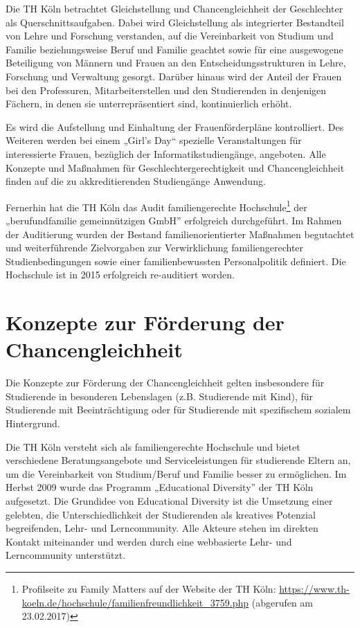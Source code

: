 Die TH Köln betrachtet Gleichstellung und Chancengleichheit der
Geschlechter als Querschnittsaufgaben. Dabei wird Gleichstellung als
integrierter Bestandteil von Lehre und Forschung verstanden, auf die
Vereinbarkeit von Studium und Familie beziehungsweise Beruf und Familie
geachtet sowie für eine ausgewogene Beteiligung von Männern und Frauen
an den Entscheidungsstrukturen in Lehre, Forschung und Verwaltung
gesorgt. Darüber hinaus wird der Anteil der Frauen bei den Professuren,
Mitarbeiterstellen und den Studierenden in denjenigen Fächern, in denen
sie unterrepräsentiert sind, kontinuierlich erhöht.

Es wird die Aufstellung und Einhaltung der Frauenförderpläne
kontrolliert. Des Weiteren werden bei einem „Girl's Day`` spezielle
Veranstaltungen für interessierte Frauen, bezüglich der
Informatikstudiengänge, angeboten. Alle Konzepte und Maßnahmen für
Geschlechtergerechtigkeit und Chancengleichheit finden auf die zu
akkreditierenden Studiengänge Anwendung.

Fernerhin hat die TH Köln das Audit familiengerechte
Hochschule\footnote{Profilseite zu Family Matters auf der Website der TH
  Köln:
  \url{https://www.th-koeln.de/hochschule/familienfreundlichkeit_3759.php}
  (abgerufen am 23.02.2017)} der „berufundfamilie gemeinnützigen GmbH''
erfolgreich durchgeführt. Im Rahmen der Auditierung wurden der Bestand
familienorientierter Maßnahmen begutachtet und weiterführende
Zielvorgaben zur Verwirklichung familiengerechter Studienbedingungen
sowie einer familienbewussten Personalpolitik definiert. Die Hochschule
ist in 2015 erfolgreich re-auditiert worden.

\section{Konzepte zur Förderung der
Chancengleichheit}\label{konzepte-zur-fuxf6rderung-der-chancengleichheit}

Die Konzepte zur Förderung der Chancengleichheit gelten insbesondere für
Studierende in besonderen Lebenslagen (z.B. Studierende mit Kind), für
Studierende mit Beeinträchtigung oder für Studierende mit spezifischem
sozialem Hintergrund.

Die TH Köln versteht sich als familiengerechte Hochschule und bietet
verschiedene Beratungsangebote und Serviceleistungen für studierende
Eltern an, um die Vereinbarkeit von Studium/Beruf und Familie besser zu
ermöglichen. Im Herbst 2009 wurde das Programm „Educational Diversity''
der TH Köln aufgesetzt. Die Grundidee von Educational Diversity ist die
Umsetzung einer gelebten, die Unterschiedlichkeit der Studierenden als
kreatives Potenzial begreifenden, Lehr- und Lerncommunity. Alle Akteure
stehen im direkten Kontakt miteinander und werden durch eine webbasierte
Lehr- und Lerncommunity unterstützt.

